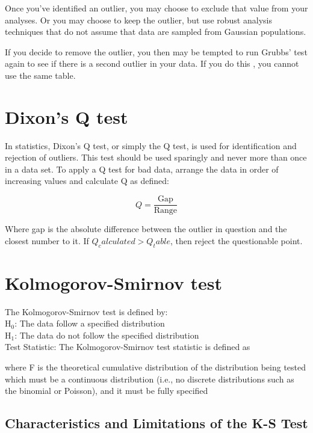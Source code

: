 Once you've identified an outlier, you may choose to exclude that value from your analyses. Or you may choose to keep the outlier, but use robust analysis techniques that do not assume that data are sampled from Gaussian populations.

If you decide to remove the outlier, you then may be tempted to run Grubbs' test again to see if there is a second outlier in your data. If you do this , you cannot use the same table.

\section{Dixon's Q test}

In statistics, Dixon's Q test, or simply the Q test, is used for identification and rejection of outliers. This test should be used sparingly and never more than once in a data set. To apply a Q test for bad data, arrange the data in order of increasing values and calculate Q as defined:

\begin{equation}
Q = \frac{\mbox{Gap}}{\mbox{Range}}
\end{equation}

Where gap is the absolute difference between the outlier in question and the closest number to it. If $Q_calculated > Q_table$, then reject the questionable point.

\section{Kolmogorov-Smirnov test}
The Kolmogorov-Smirnov test is defined by:
\\
H$_0$:     The data follow a specified distribution\\
H$_1$:     The data do not follow the specified distribution\\

Test Statistic:     The Kolmogorov-Smirnov test statistic is defined as

where F is the theoretical cumulative distribution of the distribution being tested which must be a continuous distribution (i.e., no discrete distributions such as the binomial or Poisson), and it must be fully specified

\subsection{ Characteristics and Limitations of the K-S Test}


